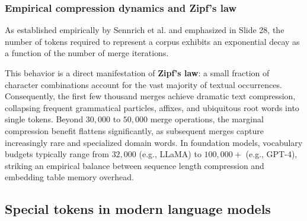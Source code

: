 \documentclass[../../main.tex]{subfiles}
\begin{document}
\subsubsection{Empirical compression dynamics and Zipf's law}
As established empirically by Sennrich et al. \cite{sennrich2016} and emphasized in Slide 28, the number of tokens required to represent a corpus exhibits an exponential decay as a function of the number of merge iterations.

This behavior is a direct manifestation of \textbf{Zipf's law}: a small fraction of character combinations account for the vast majority of textual occurrences. Consequently, the first few thousand merges achieve dramatic text compression, collapsing frequent grammatical particles, affixes, and ubiquitous root words into single tokens. Beyond $30{,}000$ to $50{,}000$ merge operations, the marginal compression benefit flattens significantly, as subsequent merges capture increasingly rare and specialized domain words. In foundation models, vocabulary budgets typically range from $32{,}000$ (e.g., LLaMA) to $100{,}000+$ (e.g., GPT-4), striking an empirical balance between sequence length compression and embedding table memory overhead.

\subsection{Special tokens in modern language models}
\label{subsec:special_tokens}
\end{document}
